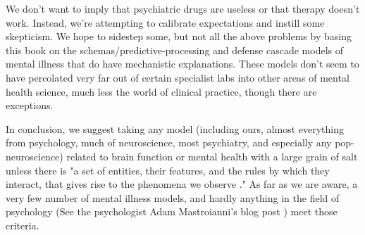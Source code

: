 \documentclass[12pt,letterpaper]{book}
\begin{document}
We don't want to imply that psychiatric drugs are useless or that therapy doesn't work. Instead, we're attempting to calibrate expectations and instill some skepticism. We hope to sidestep some, but not all the above problems by basing this book on the schemas/predictive-processing and defense cascade models of mental illness that do have mechanistic explanations. These models don't seem to have percolated very far out of certain specialist labs into other areas of mental health science, much less the world of clinical practice, though there are exceptions.

In conclusion, we suggest taking any model (including ours, almost everything from psychology, much of neuroscience, most psychiatry, and especially any pop-neuroscience) related to brain function or mental health with a large grain of salt unless there is "a set of entities, their features, and the rules by which they interact, that gives rise to the phenomena we observe \cite{mechanisticModels}." As far as we are aware, a very few number of mental illness models, and hardly anything in the field of psychology (See the psychologist Adam Mastroianni's blog post \textcite{MastroianniPsychology}) meet those criteria.
\end{document}
